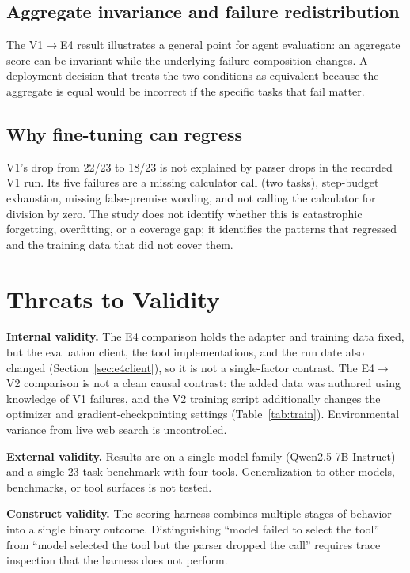 \documentclass[10pt,twocolumn]{article}
\begin{document}
\subsection{Aggregate invariance and failure redistribution}

The V1$\to$E4 result illustrates a general point for agent evaluation: an aggregate score can be invariant while the underlying failure composition changes. A deployment decision that treats the two conditions as equivalent because the aggregate is equal would be incorrect if the specific tasks that fail matter.

\subsection{Why fine-tuning can regress}

V1's drop from 22/23 to 18/23 is not explained by parser drops in the recorded V1 run. Its five failures are a missing calculator call (two tasks), step-budget exhaustion, missing false-premise wording, and not calling the calculator for division by zero. The study does not identify whether this is catastrophic forgetting, overfitting, or a coverage gap; it identifies the patterns that regressed and the training data that did not cover them.

\section{Threats to Validity}
\label{sec:threats}

\textbf{Internal validity.} The E4 comparison holds the adapter and training data fixed, but the evaluation client, the tool implementations, and the run date also changed (Section~\ref{sec:e4client}), so it is not a single-factor contrast. The E4$\to$V2 comparison is not a clean causal contrast: the added data was authored using knowledge of V1 failures, and the V2 training script additionally changes the optimizer and gradient-checkpointing settings (Table~\ref{tab:train}). Environmental variance from live web search is uncontrolled.

\textbf{External validity.} Results are on a single model family (Qwen2.5-7B-Instruct) and a single 23-task benchmark with four tools. Generalization to other models, benchmarks, or tool surfaces is not tested.

\textbf{Construct validity.} The scoring harness combines multiple stages of behavior into a single binary outcome. Distinguishing ``model failed to select the tool'' from ``model selected the tool but the parser dropped the call'' requires trace inspection that the harness does not perform.
\end{document}
